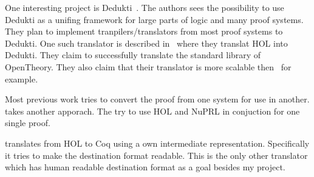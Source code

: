 One interesting project is Dedukti~\cite{assaf2016dedukti}. The authors sees
the possibility to use Dedukti as a unifing framework for large parts of logic
and many proof systems. They plan to implement tranpilers/translators from most
proof systems to Dedukti. One such translator is described
in~\cite{assaf2015translating} where they translat HOL into Dedukti. They claim
to successfully translate the standard library of OpenTheory. %
They also claim that their translator is more scalable
then~\cite{obua2006importing} for example.

Most previous work tries to convert the proof from one system for use in
another. \cite{felty1997hybrid} takes another apporach. The try to use HOL and
NuPRL in conjuction for one single proof.

\cite{denney2000prototype} translates from HOL to Coq using a own intermediate
representation. Specifically it tries to make the destination format readable.
This is the only other translator which has human readable destination format
as a goal besides my project.

